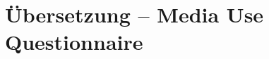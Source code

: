 %
%
\glsresetall

\let\raggedsection\centering 
\chapter{Übersetzung -- Media Use Questionnaire}\label{chap.appendix_mediaUseQuestionnaire}
\let\raggedsection\raggedright 
